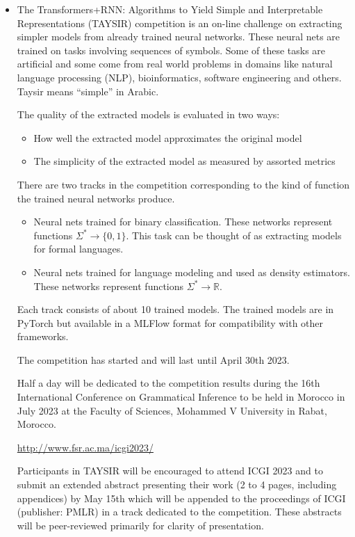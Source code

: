 \documentclass[prodmode,acmtecs]{acmsmall} %
\begin{document}
\begin{itemize}\item  The Transformers+RNN: Algorithms to Yield Simple and Interpretable Representations (TAYSIR) competition is an on-line challenge on extracting simpler models from already trained neural networks. These neural nets are trained on tasks involving sequences of symbols. Some of these tasks are artificial and some come from real world problems in domains like natural language processing (NLP), bioinformatics, software engineering and others. Taysir means ``simple'' in Arabic. 
 
  The quality of the extracted models is evaluated in two ways: 
 
\begin{itemize}\item  How well the extracted model approximates the original model
\item  The simplicity of the extracted model as measured by assorted metrics
\end{itemize} 
  There are two tracks in the competition corresponding to the kind of function the trained neural networks produce.  
 
\begin{itemize}\item  Neural nets trained for binary classification. These networks represent functions $\Sigma^* \to \{0,1\}$. This task can be thought of as extracting models for formal languages.
\item  Neural nets trained for language modeling and used as density estimators. These networks represent functions $\Sigma^* \to \mathbb{R}$. 
\end{itemize} 
  Each track consists of about 10 trained models. The trained models are in PyTorch but available in a MLFlow format for compatibility with other frameworks. 
 
  The competition has started and will last until April 30th 2023. 
 
  Half a day will be dedicated to the competition results during the 16th International Conference on Grammatical Inference to be held in Morocco in July 2023 at the Faculty of Sciences, Mohammed V University in Rabat, Morocco. 
 
  \href{http://www.fsr.ac.ma/icgi2023/}{http://www.fsr.ac.ma/icgi2023/} 
 
  Participants in TAYSIR will be encouraged to attend ICGI 2023 and to submit an extended abstract presenting their work (2 to 4 pages, including appendices) by May 15th which will be appended to the proceedings of ICGI (publisher: PMLR) in a track dedicated to the competition. These abstracts will be peer-reviewed primarily for clarity of presentation. 
 

\end{itemize}
\end{document}
